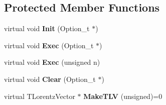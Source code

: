 \subsection*{Protected Member Functions}
\begin{DoxyCompactItemize}
\item 
\hypertarget{class_h_a_l_1_1internal_1_1_import_particle_algo_a5b2bfe1d3925458d89a1423fb8701600}{virtual void {\bfseries Init} (Option\-\_\-t $\ast$)}\label{class_h_a_l_1_1internal_1_1_import_particle_algo_a5b2bfe1d3925458d89a1423fb8701600}

\item 
\hypertarget{class_h_a_l_1_1internal_1_1_import_particle_algo_ad134e24be1e2bc7f3a874143c9213ab2}{virtual void {\bfseries Exec} (Option\-\_\-t $\ast$)}\label{class_h_a_l_1_1internal_1_1_import_particle_algo_ad134e24be1e2bc7f3a874143c9213ab2}

\item 
\hypertarget{class_h_a_l_1_1internal_1_1_import_particle_algo_a47c43c535eefb75dfd4db48952a05053}{virtual void {\bfseries Exec} (unsigned n)}\label{class_h_a_l_1_1internal_1_1_import_particle_algo_a47c43c535eefb75dfd4db48952a05053}

\item 
\hypertarget{class_h_a_l_1_1internal_1_1_import_particle_algo_a3f3c1d8bfcbfcf0d26fe7d158d7bd255}{virtual void {\bfseries Clear} (Option\-\_\-t $\ast$)}\label{class_h_a_l_1_1internal_1_1_import_particle_algo_a3f3c1d8bfcbfcf0d26fe7d158d7bd255}

\item 
\hypertarget{class_h_a_l_1_1internal_1_1_import_particle_algo_ad354dacc66152cf8577db7da148d4df4}{virtual T\-Lorentz\-Vector $\ast$ {\bfseries Make\-T\-L\-V} (unsigned)=0}\label{class_h_a_l_1_1internal_1_1_import_particle_algo_ad354dacc66152cf8577db7da148d4df4}

\end{DoxyCompactItemize}
